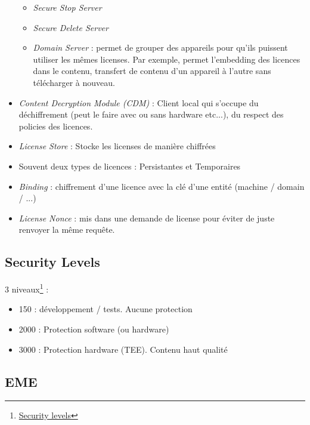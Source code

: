 \documentclass[french]{article}
\begin{document}
\begin{itemize}
\begin{itemize}
		\item \emph{Secure Stop Server}
		
		\item \emph{Secure Delete Server}
		
		\item \emph{Domain Server} : permet de grouper des appareils pour qu'ils puissent utiliser les mêmes licenses. Par exemple, permet l'embedding des licences dans le contenu, transfert de contenu d'un appareil à l'autre sans télécharger à nouveau.
	\end{itemize}
	
	\item \emph{Content Decryption Module (CDM)} : Client local qui s'occupe du déchiffrement (peut le faire avec ou sans hardware etc...), du respect des policies des licences.
	
	\item \emph{License Store} : Stocke les licenses de manière chiffrées
	
	\item Souvent deux types de licences : Persistantes et Temporaires
	
	\item \emph{Binding} : chiffrement d'une licence avec la clé d'une entité (machine / domain / ...)
	
	\item \emph{License Nonce} : mis dans une demande de license pour éviter de juste renvoyer la même requête.
	
\end{itemize}


\subsection{Security Levels}

3 niveaux\footnote{\href{https://learn.microsoft.com/en-us/playready/overview/security-level}{Security levels}} :

\begin{itemize}
	\item 150 : développement / tests. Aucune protection
	\item 2000 : Protection software (ou hardware)
	\item 3000 : Protection hardware (TEE). Contenu haut qualité
\end{itemize}


\subsection{EME}
\end{document}
